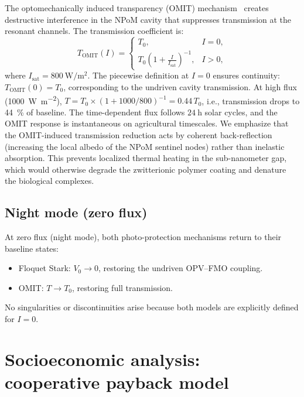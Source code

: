 \documentclass[11pt,a4paper]{article}
\begin{document}
The optomechanically induced transparency (OMIT) mechanism~\cite{Aspelmeyer2014} creates destructive interference in the NPoM cavity that suppresses transmission at the resonant channels.
The transmission coefficient is:
\begin{equation}
T_{\mathrm{OMIT}}(I) = 
\begin{cases}
T_0, & I = 0, \\
T_0 \left(1 + \frac{I}{I_{\mathrm{sat}}}\right)^{-1}, & I > 0,
\end{cases}
\label{eq:SI_omit}
\end{equation}
where $I_{\mathrm{sat}} = \qty{800}{\W\per\m\squared}$.
The piecewise definition at $I=0$ ensures continuity: $T_{\mathrm{OMIT}}(0) = T_0$, corresponding to the undriven cavity transmission.
At high flux (\qty{1000}{\W\per\m\squared}), $T = T_0 \times (1 + 1000/800)^{-1} = 0.44\,T_0$, i.e., transmission drops to \qty{44}{\percent} of baseline.
The time-dependent flux follows $\qty{24}{\hour}$ solar cycles, and the OMIT response is instantaneous on agricultural timescales. We emphasize that the OMIT-induced transmission reduction acts by coherent back-reflection (increasing the local albedo of the NPoM sentinel nodes) rather than inelastic absorption. This prevents localized thermal heating in the sub-nanometer gap, which would otherwise degrade the zwitterionic polymer coating and denature the biological complexes.

\subsection{Night mode (zero flux)}

At zero flux (night mode), both photo-protection mechanisms return to their baseline states:
\begin{itemize}
\item Floquet Stark: $V_0 \to 0$, restoring the undriven OPV--FMO coupling.
\item OMIT: $T \to T_0$, restoring full transmission.
\end{itemize}
No singularities or discontinuities arise because both models are explicitly defined for $I=0$.


\section{Socioeconomic analysis: cooperative payback model}
\label{SI-sec:socioeconomic}
\end{document}
